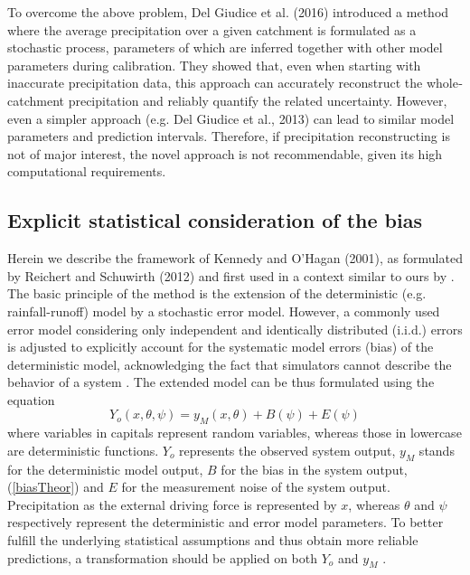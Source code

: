 \documentclass{ctuthesis}\usepackage[]{graphicx}\usepackage[]{color}
\begin{document}
To overcome the above problem, Del Giudice et al. (2016) introduced a method where the
average precipitation over a given catchment is formulated as a stochastic process, parameters of
which are inferred together with other model parameters during calibration. They
showed that, even when starting with inaccurate precipitation data, this approach can accurately
reconstruct the whole‐catchment precipitation and reliably quantify the related uncertainty.
However, even a simpler approach (e.g. Del Giudice et al., 2013) can lead to similar model
parameters and prediction intervals. Therefore, if precipitation reconstructing is not of major
interest, the novel approach is not recommendable, given its high computational requirements.


\subsection{Explicit statistical consideration of the bias} \label{delGiudTheor}

Herein we describe the framework of Kennedy and O’Hagan (2001), as formulated by Reichert and Schuwirth (2012) and first used in a context similar to ours by \cite{giudice2013improving}. The basic principle of the method is the extension of the deterministic (e.g. rainfall-runoff) model by a stochastic error model. However, a commonly used error model considering only independent and identically distributed (i.i.d.) errors is adjusted to explicitly account for the systematic model errors (bias) of the deterministic model, acknowledging the fact that simulators cannot describe the  behavior of a system \citep{giudice2013improving}. The extended model can be thus formulated using the equation
\begin{equation} \label{eq:ext_model}
Y_o (x,\theta, \psi) = y_M (x, \theta) + B (\psi) + E (\psi)
\end{equation}
where variables in capitals represent random variables, whereas those in lowercase are deterministic functions. $Y_o$ represents the observed system output, $y_M$ stands for the deterministic model output, $B$ for the bias in the system output, (\ref{biasTheor}) and $E$ for the measurement noise of the system output. Precipitation as the external driving force is represented by $x$, whereas $\theta$ and $\psi$ respectively represent the deterministic and error model parameters. To better fulfill the underlying statistical assumptions and thus obtain more reliable predictions, a transformation should be applied on both $Y_o$ and $y_M$ \citep{giudice2013improving}. 
\end{document}

